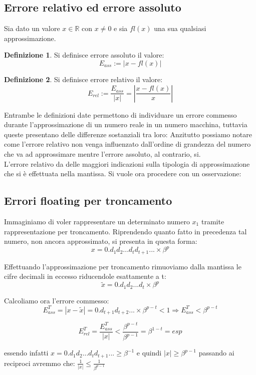\documentclass[12pt, a4paper]{book}
\theoremstyle{definition}
\newtheorem{defn}{Definizione}[section]
\begin{document}
\subsection{Errore relativo ed errore assoluto}
\begin{flushleft}
Sia dato un valore $x \in \mathbb{R}$ con $x \neq 0$ e sia $fl(x)$ una sua qualsiasi approssimazione. 
\begin{defn}
Si definisce errore assoluto il valore: \[ E_{ass}:= |x - fl(x)| \]
\end{defn}
\begin{defn}
Si definisce errore relativo il valore: \[E_{rel}:= \frac{E_{ass}}{|x|} =  \displaystyle\left\lvert \frac{x - fl(x)}{x} \right\rvert\]
\end{defn}
Entrambe le definizioni date permettono di individuare un errore commesso durante l'approssimazione di un numero reale in un numero macchina, tuttavia queste presentano delle differenze sostanziali tra loro: 
Anzitutto possiamo notare come l'errore relativo non venga influenzato dall'ordine di grandezza del numero che va ad approssimare mentre l'errore assoluto, al contrario, si. \\
L'errore relativo da delle maggiori indicazioni sulla tipologia di approssimazione che si è effettuata nella mantissa.  
Si vuole ora procedere con un osservazione:
\end{flushleft}

\subsection{Errori floating per troncamento}
\begin{flushleft}
Immaginiamo di voler rappresentare un determinato numero $x_{1}$  tramite rappresentazione per troncamento. 
Riprendendo quanto fatto in precedenza tal numero, non ancora approssimato,  si presenta in questa forma: 
\[
	 x = 0.d_{1}d_{2}...d_{t}d_{t+1}... \times \beta^{p} 
\]

Effettuando l'approssimazione per troncamento rimuoviamo dalla mantissa le cifre decimali in eccesso riducendole esattamente a t:
\[ 
	\widetilde{x} = 0.d_{1}d_{2}...d_{t}\times\beta^{p} 
\]

Calcoliamo ora l'errore commesso: 
\[ 
	E_{ass}^{T} = |x - \widetilde{x}| =   0.d_{t+1}d_{t+2}...\times\beta^{p-t} < 1 \Longrightarrow  E_{ass}^{T} < \beta^{p-t}  
\]

\[
	E_{rel}^{T} = \frac{E_{ass}^{T}}{|x|} < \frac{ \beta^{p-t}}{ \beta^{p-1}} =  \beta^{1-t} = esp \]

essendo infatti $x = 0.d_{1}d_{2}...d_{t}d_{t+1}... \geq \beta^{-1}$ e quindi $|x| \geq \beta^{p-1}$ passando ai reciproci avremmo che: $\frac{1}{|x|} \leq \frac{1}{\beta^{p-1}}$
\end{flushleft}
\pagebreak
\end{document}
